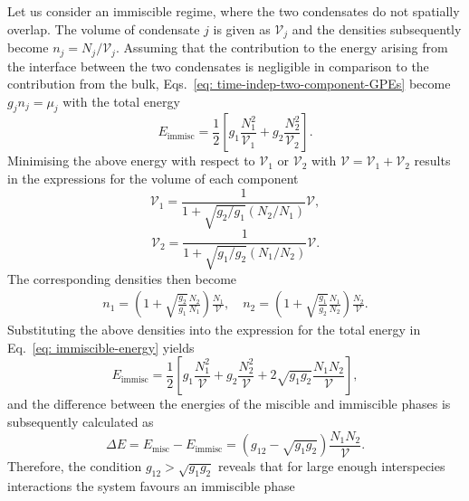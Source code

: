 Let us consider an immiscible regime, where the two condensates do not spatially
overlap.
The volume of condensate \(j\) is given as \(\mathcal{V}_j\) and the densities
subsequently become \(n_j=N_j/\mathcal{V}_j\).
Assuming that the contribution to the energy arising from the interface between
the two condensates is negligible in comparison to the contribution from the
bulk, Eqs.~\eqref{eq: time-indep-two-component-GPEs} become \(g_j n_j = \mu_j\)
with the total energy
\begin{equation}\label{eq: immiscible-energy}
    E_\mathrm{immisc} = \frac{1}{2}\left[g_1\frac{N_1^2}{\mathcal{V}_1}
        + g_2\frac{N_2^2}{\mathcal{V}_2}\right].
\end{equation}
Minimising the above energy with respect to \(\mathcal{V}_1\) or
\(\mathcal{V}_2\) with \(\mathcal{V}=\mathcal{V}_1+\mathcal{V}_2\) results in
the expressions for the volume of each component
\begin{equation}
    \mathcal{V}_1 = \frac{1}{1 + \sqrt{g_2/g_1}(N_2/N_1)}\mathcal{V},
\end{equation}
\begin{equation}
    \mathcal{V}_2 = \frac{1}{1 + \sqrt{g_1/g_2}(N_1/N_2)}\mathcal{V}.
\end{equation}
The corresponding densities then become
\begin{equation}
    \begin{aligned}
        n_1 = \left(1 + \sqrt{\frac{g_2}{g_1}}\frac{N_2}{N_1}\right)
        \frac{N_1}{\mathcal{V}}, \quad
        n_2 = \left(1 + \sqrt{\frac{g_1}{g_2}}\frac{N_1}{N_2}\right)
        \frac{N_2}{\mathcal{V}}.
    \end{aligned}
\end{equation}
Substituting the above densities into the expression for the total energy
in Eq.~\eqref{eq: immiscible-energy} yields
\begin{equation}
    E_\mathrm{immisc} = \frac{1}{2}\left[g_1\frac{N_1^2}{\mathcal{V}}
    + g_2\frac{N_2^2}{\mathcal{V}}
    + 2\sqrt{g_1g_2}\frac{N_1N_2}{\mathcal{V}}\right],
\end{equation}
and the difference between the energies of the miscible and immiscible phases is
subsequently calculated as
\begin{equation}
    \Delta E = E_\mathrm{misc} - E_\mathrm{immisc} = (g_{12} - \sqrt{g_1g_2})
    \frac{N_1N_2}{\mathcal{V}}.
\end{equation}
Therefore, the condition \(g_{12} > \sqrt{g_1g_2}\) reveals that for large
enough interspecies interactions the system favours an immiscible phase
